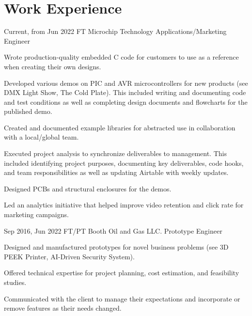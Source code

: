 \documentclass[
	10pt, %
]{FreemanCV}
\begin{document}
\vspace{-35pt}

\section{Work Experience}





\jobentry
	{Current, from Jun 2022} %
	{FT} %
	{Microchip Technology} %
	{Applications/Marketing Engineer} %
	{ %
		\item Wrote production-quality embedded C code for customers to use as a reference when creating their own designs.
		\item Developed various demos on PIC and AVR microcontrollers for new products (see DMX Light Show, The Cold Plate). This included writing and documenting code and test conditions as well as completing design documents and flowcharts for the published demo.
		\item Created and documented example libraries for abstracted use in collaboration with a local/global team.
		\item Executed project analysis to synchronize deliverables to management. This included identifying project purposes, documenting key deliverables, code hooks, and team responsibilities as well as updating Airtable with weekly updates.
		\item Designed PCBs and structural enclosures for the demos.
		\item Led an analytics initiative that helped improve video retention and click rate for marketing campaigns.
	} 


\jobentry
	{Sep 2016, Jun 2022} %
	{FT/PT} %
	{Booth Oil and Gas LLC.} %
	{Prototype Engineer} %
	{ %
		\item Designed and manufactured prototypes for novel business problems (see 3D PEEK Printer, AI-Driven Security System).
		\item Offered technical expertise for project planning, cost estimation, and feasibility studies.
		\item Communicated with the client to manage their expectations and incorporate or remove features as their needs changed.
	}
	
\end{document}
